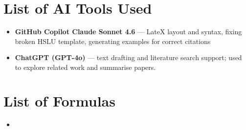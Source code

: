 \chapter*{List of AI Tools Used}

\begin{itemize}
    \item \textbf{GitHub Copilot Claude Sonnet 4.6} — LateX layout and syntax, fixing broken HSLU template, generating examples for correct citations
    \item \textbf{ChatGPT (GPT-4o)} — text drafting and literature search support; used to explore related work and summarise papers.

\end{itemize}

\chapter*{List of Formulas}

\begin{itemize}
    \item %
\end{itemize}
